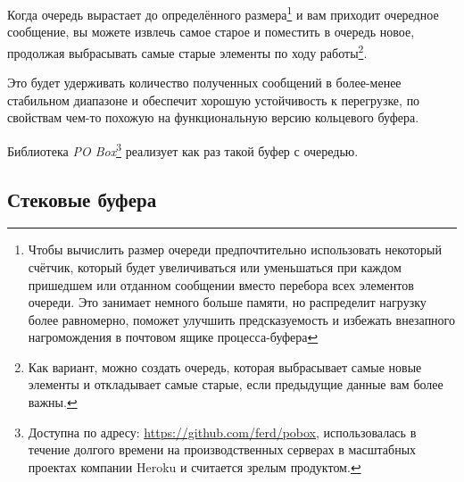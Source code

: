 Когда очередь вырастает до определённого размера\footnote{Чтобы вычислить размер очереди предпочтительно использовать некоторый счётчик, который будет увеличиваться или уменьшаться при каждом пришедшем или отданном сообщении вместо перебора всех элементов очереди. Это занимает немного больше памяти, но распределит нагрузку более равномерно, поможет улучшить предсказуемость и избежать внезапного нагромождения в почтовом ящике процесса-буфера} и вам приходит очередное сообщение, вы можете извлечь самое старое и поместить в очередь новое, продолжая выбрасывать самые старые элементы по ходу работы\footnote{Как вариант, можно создать очередь, которая выбрасывает самые новые элементы и откладывает самые старые, если предыдущие данные вам более важны.}.

Это будет удерживать количество полученных сообщений в более-менее стабильном диапазоне и обеспечит хорошую устойчивость к перегрузке, по свойствам чем-то похожую на функциональную версию кольцевого буфера.

Библиотека \emph{PO Box}\footnote{Доступна по адресу: \href{https://github.com/ferd/pobox}{https://github.com/ferd/pobox}, использовалась в течение долгого времени на производственных серверах в масштабных проектах компании Heroku и считается зрелым продуктом.} реализует как раз такой буфер с очередью.


\subsection{Стековые буфера}


